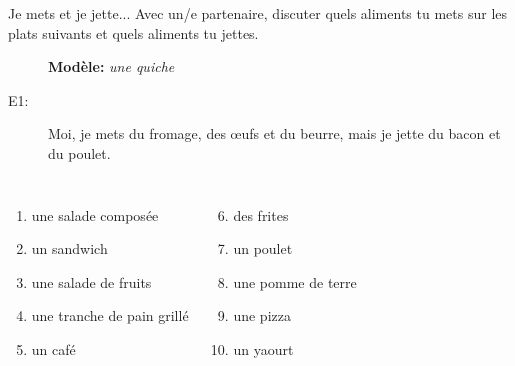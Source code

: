 \begin{frame}{Je mets et je jette...}
  Avec un/e partenaire, discuter quels aliments tu \alert{mets} sur les plats suivants et quels aliments tu \alert{jettes}. \\
  \begin{description}
    \item[] \textbf{Modèle:} \emph{une quiche}
    \item[E1:] Moi, je mets du fromage, des œufs et du beurre, mais je jette du bacon et du poulet.
  \end{description}
  \begin{columns}
      \begin{enumerate}
        \item une salade composée
        \item un sandwich
        \item une salade de fruits
        \item une tranche de pain grillé
        \item un café
      \end{enumerate}
      \begin{enumerate}
        \setcounter{enumi}{5}
        \item des frites
        \item un poulet
        \item une pomme de terre
        \item une pizza
        \item un yaourt
      \end{enumerate}
  \end{columns}
\end{frame}
